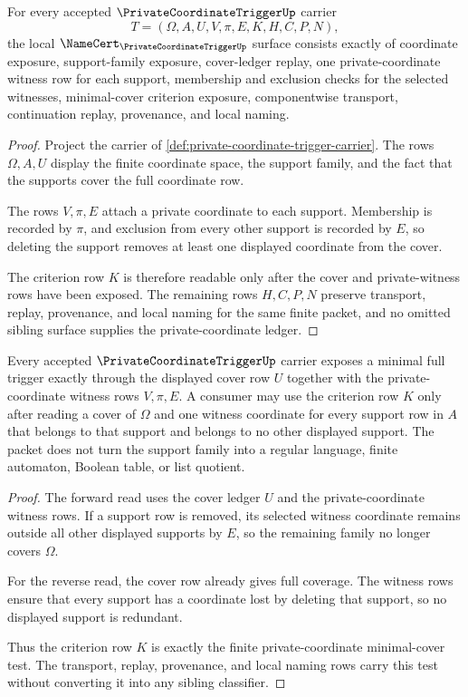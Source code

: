 \begin{theorem}
\label{thm:private-coordinate-trigger-namecert-obligations}
For every accepted $\PrivateCoordinateTriggerUp$ carrier
$$
T=(\Omega,A,U,V,\pi,E,K,H,C,P,N),
$$
the local $\NameCert_{\PrivateCoordinateTriggerUp}$ surface consists exactly of coordinate exposure, support-family exposure, cover-ledger replay, one private-coordinate witness row for each support, membership and exclusion checks for the selected witnesses, minimal-cover criterion exposure, componentwise transport, continuation replay, provenance, and local naming.
\end{theorem}
\begin{proof}
Project the carrier of \autoref{def:private-coordinate-trigger-carrier}. The rows $\Omega,A,U$ display the finite coordinate space, the support family, and the fact that the supports cover the full coordinate row.

The rows $V,\pi,E$ attach a private coordinate to each support. Membership is recorded by $\pi$, and exclusion from every other support is recorded by $E$, so deleting the support removes at least one displayed coordinate from the cover.

The criterion row $K$ is therefore readable only after the cover and private-witness rows have been exposed. The remaining rows $H,C,P,N$ preserve transport, replay, provenance, and local naming for the same finite packet, and no omitted sibling surface supplies the private-coordinate ledger.
\end{proof}

\begin{theorem}
\label{thm:private-coordinate-trigger-minimal-cover-criterion}
Every accepted $\PrivateCoordinateTriggerUp$ carrier exposes a minimal full trigger exactly through the displayed cover row $U$ together with the private-coordinate witness rows $V,\pi,E$. A consumer may use the criterion row $K$ only after reading a cover of $\Omega$ and one witness coordinate for every support row in $A$ that belongs to that support and belongs to no other displayed support. The packet does not turn the support family into a regular language, finite automaton, Boolean table, or list quotient.
\end{theorem}
\begin{proof}
The forward read uses the cover ledger $U$ and the private-coordinate witness rows. If a support row is removed, its selected witness coordinate remains outside all other displayed supports by $E$, so the remaining family no longer covers $\Omega$.

For the reverse read, the cover row already gives full coverage. The witness rows ensure that every support has a coordinate lost by deleting that support, so no displayed support is redundant.

Thus the criterion row $K$ is exactly the finite private-coordinate minimal-cover test. The transport, replay, provenance, and local naming rows carry this test without converting it into any sibling classifier.
\end{proof}

